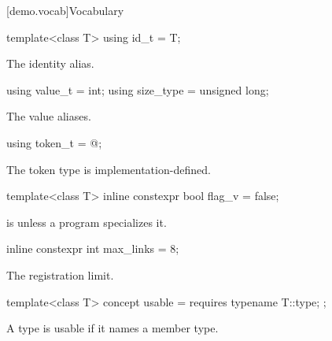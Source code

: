 [demo.vocab]{Vocabulary}

%
\begin{itemdecl}
template<class T>
  using id_t = T;
\end{itemdecl}

\begin{itemdescr}
\pnum
\remarks
The identity alias.
\end{itemdescr}

%
%
\begin{itemdecl}
using value_t = int;
using size_type = unsigned long;
\end{itemdecl}

\begin{itemdescr}
\pnum
\remarks
The value aliases.
\end{itemdescr}

%
\begin{itemdecl}
using token_t = @\impdef@;
\end{itemdecl}

\begin{itemdescr}
\pnum
\remarks
The token type is implementation-defined.
\end{itemdescr}

%
\begin{itemdecl}
template<class T>
  inline constexpr bool flag_v = false;
\end{itemdecl}

\begin{itemdescr}
\pnum
\remarks
{} is  unless a program specializes it.
\end{itemdescr}

%
\begin{itemdecl}
inline constexpr int max_links = 8;
\end{itemdecl}

\begin{itemdescr}
\pnum
\remarks
The registration limit.
\end{itemdescr}

%
\begin{itemdecl}
template<class T>
  concept usable = requires { typename T::type; };
\end{itemdecl}

\begin{itemdescr}
\pnum
\remarks
A type is usable if it names a member type.
\end{itemdescr}

